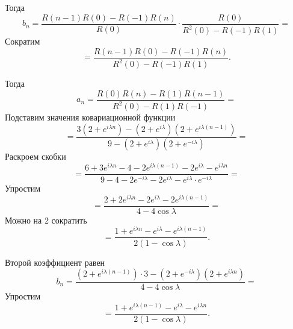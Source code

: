 \begin{enumerate}[label=\alph*)]
  Тогда
  \begin{equation*}
    b_n =
    \frac{R \left( n - 1 \right) R \left( 0 \right) - R \left( -1 \right) R \left( n \right) }{R \left( 0 \right) } \cdot
    \frac{R \left( 0 \right) }{R^2 \left( 0 \right) - R \left( -1 \right) R \left( 1 \right) } =
  \end{equation*}
  Сократим
  \begin{equation*}
    = \frac{R \left( n - 1 \right) R \left( 0 \right) - R \left( -1 \right) R \left( n \right) }{R^2 \left( 0 \right) - R \left( -1 \right) R \left( 1 \right) }.
  \end{equation*}

  Тогда
  \begin{equation*}
    a_n =
    \frac{R \left( 0 \right) R \left( n \right) - R \left( 1 \right) R \left( n - 1 \right) }{R^2 \left( 0 \right) - R \left( 1 \right) R \left( -1 \right) } =
  \end{equation*}
  Подставим значения ковариационной функции
  \begin{equation*}
    = \frac{3 \left( 2 + e^{i \lambda n} \right) - \left( 2 + e^{i \lambda } \right) \left( 2 + e^{i \lambda \left(n - 1 \right) } \right) }{9 - \left( 2 + e^{i \lambda } \right) \left( 2 + e^{-i \lambda } \right) } =
  \end{equation*}
  Раскроем скобки
  \begin{equation*}
    = \frac{6 + 3e^{i \lambda n} - 4 - 2e^{i \lambda \left( n - 1 \right) } - 2e^{i \lambda } - e^{i \lambda n}}{9 - 4 - 2e^{-i \lambda } - 2e^{i \lambda } - e^{i \lambda } \cdot e^{-i \lambda }} =
  \end{equation*}
  Упростим
  \begin{equation*}
    = \frac{2 + 2e^{i \lambda n} - 2e^{i \lambda} - 2e^{i \lambda \left( n - 1 \right) }}{4 - 4 \cos \lambda } =
  \end{equation*}
  Можно на 2 сократить
  \begin{equation*}
    = \frac{1 + e^{i \lambda n} - e^{i \lambda} - e^{i \lambda \left( n - 1 \right) }}{2 \left( 1 - \cos \lambda \right) }.
  \end{equation*}

  Второй коэффициент равен
  \begin{equation*}
    b_n =
    \frac{ \left( 2 + e^{i \lambda \left( n - 1 \right) } \right) \cdot 3 - \left( 2 + e^{-i \lambda } \right) \left( 2 + e^{i \lambda n} \right) }{4 - 4 \cos \lambda } =
  \end{equation*}
  Упростим
  \begin{equation*}
    = \frac{1 + e^{i \lambda \left( n - 1 \right) } - e^{i \lambda } - e^{i \lambda n}}{2 \left( 1 - \cos \lambda \right) }.
  \end{equation*}


\end{enumerate}
